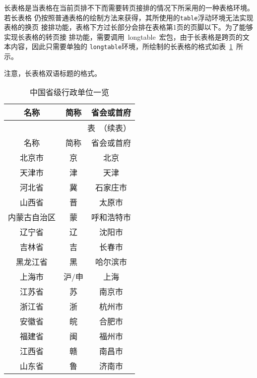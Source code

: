 长表格是当表格在当前页排不下而需要转页接排的情况下所采用的一种表格环境。若长表格
仍按照普通表格的绘制方法来获得，其所使用的\verb|table|浮动环境无法实现表格的换页
接排功能，表格下方过长部分会排在表格第1页的页脚以下。为了能够实现长表格的转页接
排功能，需要调用~longtable~宏包，由于长表格是跨页的文本内容，因此只需要单独的
\verb|longtable|环境，所绘制的长表格的格式如表~\ref{table2}~所示。

注意，长表格双语标题的格式。

\vspace{-1.5bp}
\ltfontsize{\wuhao[1.667]}
\wuhao[1.667]\begin{longtable}{ccc}%
	\caption{中国省级行政单位一览}\label{table2}           \\
	\toprule[1.5pt] 名称 & 简称  & 省会或首府              \\ \midrule[1pt]
	\endfirsthead
	\multicolumn{3}{r}{表~\thetable（续表）}\vspace{0.5em} \\
	\toprule[1.5pt] 名称 & 简称  & 省会或首府              \\ \midrule[1pt]
	\endhead
	\bottomrule[1.5pt]
	\endfoot
	北京市               & 京    & 北京                    \\
	天津市               & 津    & 天津                    \\
	河北省               & 冀    & 石家庄市                \\
	山西省               & 晋    & 太原市                  \\
	内蒙古自治区         & 蒙    & 呼和浩特市              \\
	辽宁省               & 辽    & 沈阳市                  \\
	吉林省               & 吉    & 长春市                  \\
	黑龙江省             & 黑    & 哈尔滨市                \\
	上海市               & 沪/申 & 上海                    \\
	江苏省               & 苏    & 南京市                  \\
	浙江省               & 浙    & 杭州市                  \\
	安徽省               & 皖    & 合肥市                  \\
	福建省               & 闽    & 福州市                  \\
	江西省               & 赣    & 南昌市                  \\
	山东省               & 鲁    & 济南市                  \\

\end{longtable}
